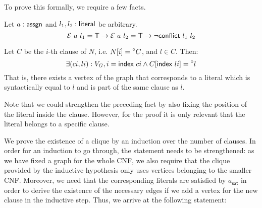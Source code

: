 To prove this formally, we require a few facts. 
\begin{fact}\label{fact:literal_conflict}
  Let $a : \textsf{assgn}$ and $l_1, l_2 : \textsf{literal}$ be arbitrary. 
  \[\mathcal{E}~a~l_1 = \mathsf{T} \rightarrow \mathcal{E}~a~l_2 = \mathsf{T} \rightarrow \lnot \textsf{conflict}{}~l_1~l_2 \]
\end{fact}

\begin{fact}\label{fact:litInClause_exists_vertex}
  Let $C$ be the $i$-th clause of $N$, i.e. $N[i] = \prescript{\circ}{}C$, and $l \in C$. Then:
  \[\exists (ci,li) : V_G, i = \textsf{index}~ci \land C[\textsf{index}~li] = \prescript{\circ}{}l\]
  That is, there exists a vertex of the graph that corresponds to a literal which is syntactically equal to $l$ and is part of the same clause as $l$.
\end{fact}
Note that we could strengthen the preceding fact by also fixing the position of the literal inside the clause. However, for the proof it is only relevant that the literal belongs to a specific clause.

We prove the existence of a clique by an induction over the number of clauses. In order for an induction to go through, the statement needs to be strengthened: as we have fixed a graph for the whole CNF, we also require that the clique provided by the inductive hypothesis only uses vertices belonging to the smaller CNF. Moreover, we need that the corresponding literals are satisfied by $a_{\textsf{sat}}$ in order to derive the existence of the necessary edges if we add a vertex for the new clause in the inductive step. Thus, we arrive at the following statement:

